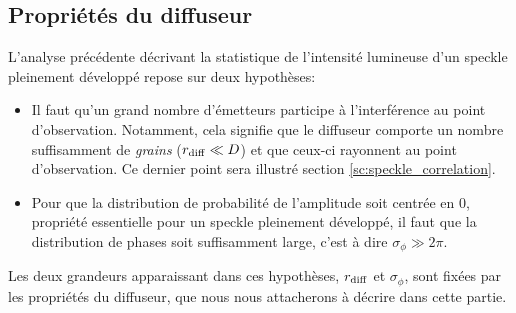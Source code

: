 \subsection{Propriétés du diffuseur}
\label{sec:propriete_diffuseur}
L'analyse précédente décrivant la statistique de l'intensité lumineuse d'un speckle pleinement développé repose sur deux hypothèses: 
\begin{itemize}
\item[\textendash] Il faut qu'un grand nombre d'émetteurs participe à l'interférence au point d'observation. Notamment, cela signifie que le diffuseur comporte un nombre suffisamment de \emph{grains} ($r_{\mathrm{diff}} \ll D$)  et que ceux-ci rayonnent au point d'observation. Ce dernier point sera illustré section \ref{sc:speckle_correlation}.
\item[\textendash] Pour que la distribution de probabilité de l'amplitude soit centrée en 0, propriété essentielle pour un speckle pleinement développé, il faut que la distribution de phases soit suffisamment large, c'est à dire $\sigma_\phi \gg 2\pi$. 
\end{itemize}
Les deux grandeurs apparaissant dans ces hypothèses, $r_{\mathrm{diff}}$ et $\sigma_\phi$, sont fixées par les propriétés du diffuseur, que nous nous attacherons à décrire dans cette partie.




